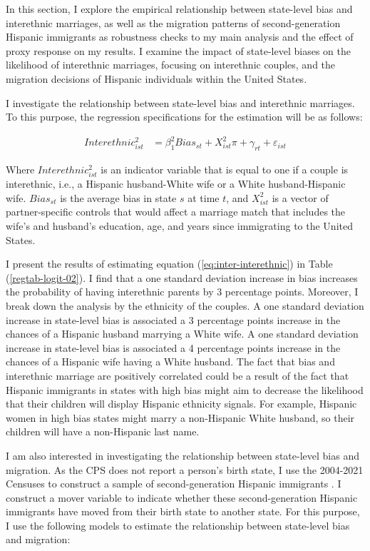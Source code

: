 \documentclass[12pt,english]{article}
\begin{document}
In this section, I explore the empirical relationship between state-level bias and interethnic marriages, as well as the migration patterns of second-generation Hispanic immigrants as robustness checks to my main analysis and the effect of proxy response on my results. I examine the impact of state-level biases on the likelihood of interethnic marriages, focusing on interethnic couples, and the migration decisions of Hispanic individuals within the United States. 

I investigate the relationship between state-level bias and interethnic marriages. To this purpose, the regression specifications for the estimation will be as follows:

\begin{align}
Interethnic_{ist}^2 &= \beta_1^2 Bias_{st} + X_{ist}^2\pi + \gamma_{rt} 
            + \varepsilon_{ist}  \label{eq:inter-interethnic} 
\end{align}

Where $Interethnic_{ist}^2$ is an indicator variable that is equal to one if a couple is interethnic, i.e., a Hispanic husband-White wife or a White husband-Hispanic wife. $Bias_{st}$ is the average bias in state $s$ at time $t$, and $X_{ist}^2$ is a vector of partner-specific controls that would affect a marriage match that includes the wife's and husband's education, age, and years since immigrating to the United States. 

I present the results of estimating equation (\ref{eq:inter-interethnic}) in Table (\ref{regtab-logit-02}). I find that a one standard deviation increase in bias increases the probability of having interethnic parents by 3 percentage points. Moreover, I break down the analysis by the ethnicity of the couples. A one standard deviation increase in state-level bias is associated a 3 percentage points increase in the chances of a Hispanic husband marrying a White wife. A one standard deviation increase in state-level bias is associated a 4 percentage points increase in the chances of a Hispanic wife having a White husband. The fact that bias and interethnic marriage are positively correlated could be a result of the fact that Hispanic immigrants in states with high bias might aim to decrease the likelihood that their children will display Hispanic ethnicity signals. For example, Hispanic women in high bias states might marry a non-Hispanic White husband, so their children will have a non-Hispanic last name.

I am also interested in investigating the relationship between state-level bias and migration. As the CPS does not report a person's birth state, I use the 2004-2021 Censuses to construct a sample of second-generation Hispanic immigrants \autocite{floodsarahIntegratedPublicUse2021}. I construct a mover variable to indicate whether these second-generation Hispanic immigrants have moved from their birth state to another state. For this purpose, I use the following models to estimate the relationship between state-level bias and migration:
\end{document}
